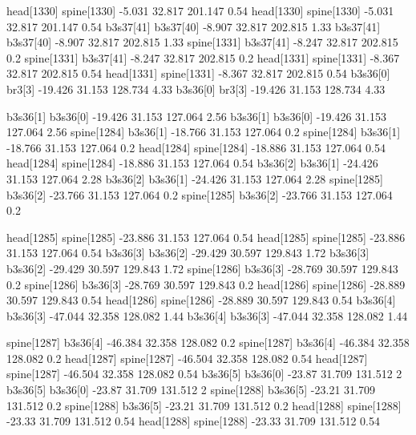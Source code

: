 head[1330]    spine[1330]    -5.031    32.817    201.147    0.54
head[1330]    spine[1330]    -5.031    32.817    201.147    0.54
b3s37[41]    b3s37[40]    -8.907    32.817    202.815    1.33
b3s37[41]    b3s37[40]    -8.907    32.817    202.815    1.33
spine[1331]    b3s37[41]    -8.247    32.817    202.815    0.2
spine[1331]    b3s37[41]    -8.247    32.817    202.815    0.2
head[1331]    spine[1331]    -8.367    32.817    202.815    0.54
head[1331]    spine[1331]    -8.367    32.817    202.815    0.54
b3s36[0]    br3[3]    -19.426    31.153    128.734    4.33
b3s36[0]    br3[3]    -19.426    31.153    128.734    4.33


b3s36[1]    b3s36[0]    -19.426    31.153    127.064    2.56
b3s36[1]    b3s36[0]    -19.426    31.153    127.064    2.56
spine[1284]    b3s36[1]    -18.766    31.153    127.064    0.2
spine[1284]    b3s36[1]    -18.766    31.153    127.064    0.2
head[1284]    spine[1284]    -18.886    31.153    127.064    0.54
head[1284]    spine[1284]    -18.886    31.153    127.064    0.54
b3s36[2]    b3s36[1]    -24.426    31.153    127.064    2.28
b3s36[2]    b3s36[1]    -24.426    31.153    127.064    2.28
spine[1285]    b3s36[2]    -23.766    31.153    127.064    0.2
spine[1285]    b3s36[2]    -23.766    31.153    127.064    0.2


head[1285]    spine[1285]    -23.886    31.153    127.064    0.54
head[1285]    spine[1285]    -23.886    31.153    127.064    0.54
b3s36[3]    b3s36[2]    -29.429    30.597    129.843    1.72
b3s36[3]    b3s36[2]    -29.429    30.597    129.843    1.72
spine[1286]    b3s36[3]    -28.769    30.597    129.843    0.2
spine[1286]    b3s36[3]    -28.769    30.597    129.843    0.2
head[1286]    spine[1286]    -28.889    30.597    129.843    0.54
head[1286]    spine[1286]    -28.889    30.597    129.843    0.54
b3s36[4]    b3s36[3]    -47.044    32.358    128.082    1.44
b3s36[4]    b3s36[3]    -47.044    32.358    128.082    1.44


spine[1287]    b3s36[4]    -46.384    32.358    128.082    0.2
spine[1287]    b3s36[4]    -46.384    32.358    128.082    0.2
head[1287]    spine[1287]    -46.504    32.358    128.082    0.54
head[1287]    spine[1287]    -46.504    32.358    128.082    0.54
b3s36[5]    b3s36[0]    -23.87    31.709    131.512    2
b3s36[5]    b3s36[0]    -23.87    31.709    131.512    2
spine[1288]    b3s36[5]    -23.21    31.709    131.512    0.2
spine[1288]    b3s36[5]    -23.21    31.709    131.512    0.2
head[1288]    spine[1288]    -23.33    31.709    131.512    0.54
head[1288]    spine[1288]    -23.33    31.709    131.512    0.54


